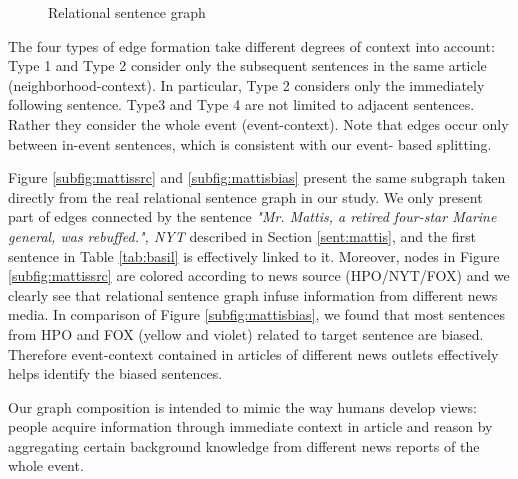 \begin{figure}[!htbp]
   \caption{ Relational sentence graph} 
  \label{fig:adg}
\end{figure}



The four types of edge formation take different degrees of context into account: Type 1 and Type 2 consider only the subsequent sentences in the same article (neighborhood-context). In particular, Type 2 considers only the immediately following sentence. Type3 and Type 4 are not limited to adjacent sentences. Rather they consider the whole event (event-context). Note that edges occur only between in-event sentences, which is consistent with our event- based splitting.

Figure \ref{subfig:mattissrc} and \ref{subfig:mattisbias} present the same subgraph taken directly from the real relational sentence graph in our study. We only present part of edges connected by the sentence \textit{"Mr. Mattis, a retired four-star Marine general, was rebuffed.", NYT} described in Section \ref{sent:mattis}, and the first sentence in Table \ref{tab:basil} is effectively linked to it. Moreover, nodes in Figure \ref{subfig:mattissrc} are colored according to news source (HPO/NYT/FOX) and we clearly see that relational sentence graph infuse information from different news media. In comparison of Figure \ref{subfig:mattisbias}, we found that most sentences from HPO and FOX (yellow and violet) related to target sentence are biased. Therefore event-context contained in articles of different news outlets effectively helps identify the biased sentences.

Our graph composition is intended to mimic the way humans develop views: people acquire information through immediate context in article and reason by aggregating certain background knowledge from different news reports of the whole event.


